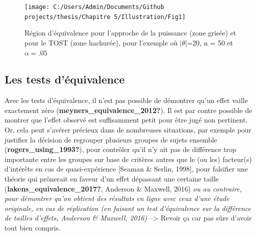 \documentclass[
  english,
  man]{apa6}
\begin{document}
\begin{figure}

{\centering \texttt{[image: C:/Users/Admin/Documents/Github projects/thesis/Chapitre 5/Illustration/Fig1]} 

}

\caption{Région d'équivalence pour l'approche de la puissance (zone grisée) et pour le TOST (zone hachurée), pour l'exemple où $|\theta$|=20, n = 50 et $\alpha=.05$}\label{fig:schuirman2}
\end{figure}

\hypertarget{les-tests-duxe9quivalence}{%
\subsection{Les tests d'équivalence}\label{les-tests-duxe9quivalence}}

Avec les tests d'équivalence, il n'est pas possible de démontrer qu'un effet vaille exactement zéro (\textbf{meyners\_equivalence\_2012?}). Il est par contre possible de montrer que l'effet observé est suffisamment petit pour être jugé non pertinent. Or, cela peut s'avérer précieux dans de nombreuses situations, par exemple pour justifier la décision de regrouper plusieurs groupes de sujets ensemble (\textbf{rogers\_using\_1993?}), pour contrôler qu'il n'y ait pas de différence trop importante entre les groupes sur base de critères autres que le (ou les) facteur(s) d'intérêts en cas de quasi-expérience {[}Seaman \& Serlin, 1998{]}, pour falsifier une théorie qui prônerait en faveur d'un effet dépassant une certaine taille (\textbf{lakens\_equivalence\_2017?}, Anderson \& Maxwell, 2016) \emph{ou au contraire, pour démontrer qu'on obtient des résultats en ligne avec ceux d'une étude originale, en cas de réplication (en faisant un test d'équivalence sur la différence de tailles d'effets, Anderson \& Maxwell, 2016)} --\textgreater{} Revoir ça car pas sûre d'avoir tout bien compris.
\end{document}

